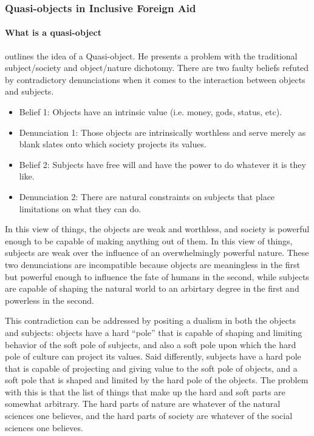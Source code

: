 \documentclass[a4paper]{article}
\begin{document}
\subsubsection{Quasi-objects in Inclusive Foreign Aid}

\paragraph{What is a quasi-object}

\cite{latour2012we} outlines the idea of a Quasi-object. He presents a problem
with the traditional subject/society and object/nature dichotomy. There are
two faulty beliefs refuted by contradictory denunciations when it comes to the
interaction between objects and subjects. 
%
\begin{itemize}
    \item[] Belief 1: Objects have an intrinsic value (i.e. money, gods,
        status, etc). 

    \item[] Denunciation 1: Those objects are intrinsically worthless and
        serve merely as blank slates onto which society projects its values.

    \item[] Belief 2: Subjects have free will and have the power to do whatever
        it is they like.

    \item[] Denunciation 2: There are natural constraints on subjects that
        place limitations on what they can do.  \end{itemize}
%
In this view of things, the objects are weak and worthless, and society is
powerful enough to be capable of making anything out of them.  In this view of
things, subjects are weak over the influence of an overwhelmingly powerful
nature.  These two denunciations are incompatible because objects are
meaningless in the first but powerful enough to influence the fate of humans
in the second, while subjects are capable of shaping the natural world to an
arbirtary degree in the first and powerless in the second. 

This contradiction can be addressed by positing a dualism in both the objects
and subjects: objects have a hard ``pole'' that is capable of shaping and
limiting behavior of the soft pole of subjects, and also a soft pole upon
which the hard pole of culture can project its values.  Said differently,
subjects have a hard pole that is capable of projecting and giving value to
the soft pole of objects, and a soft pole that is shaped and limited by the
hard pole of the objects.  The problem with this is that the list of things
that make up the hard and soft parts are somewhat arbitrary. The hard parts of
nature are whatever of the natural sciences one believes, and the hard parts
of society are whatever of the social sciences one believes. 
\end{document}
